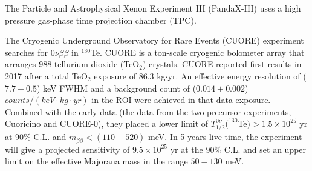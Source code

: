 The Particle and Astrophysical Xenon Experiment III (PandaX-III) uses a high pressure gas-phase time projection chamber (TPC).

The Cryogenic Underground Observatory for Rare Events (CUORE) experiment searches for $0\nu\beta\beta$ in $^{130}$Te. CUORE is a ton-scale cryogenic bolometer array that arranges 988 tellurium dioxide (TeO$_2$) crystals. CUORE reported first results in 2017 after a total TeO$_2$ exposure of 86.3 kg$\cdot$yr. An effective energy resolution of ($7.7\pm 0.5$) keV FWHM and a background count of ($0.014\pm0.002$) $counts/(keV\cdot kg\cdot yr)$ in the ROI were achieved in that data exposure. Combined with the early data (the data from the two precursor experiments, Cuoricino and CUORE-0), they placed a lower limit of $T^{0\nu}_{1/2}(^{130}$Te$)>1.5\times 10^{25}$ yr at 90\% C.L. and $m_{\beta\beta}<(110-520)$ meV\cite{alduino2018first}. In 5 years live time, the experiment will give a projected sensitivity of $9.5\times 10^{25}$ yr at the 90\% C.L. and set an upper limit on the effective Majorana mass in the range $50-130$ meV\cite{piperno2015dark}.

